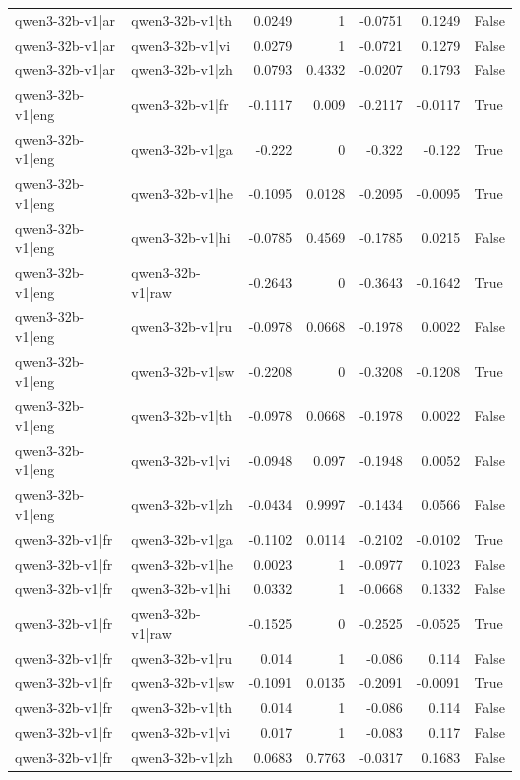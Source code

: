 \begin{table}
\begin{tabular}{l l r r r r l}
qwen3-32b-v1|ar & qwen3-32b-v1|th & 0.0249 & 1 & -0.0751 & 0.1249 & False \\
qwen3-32b-v1|ar & qwen3-32b-v1|vi & 0.0279 & 1 & -0.0721 & 0.1279 & False \\
qwen3-32b-v1|ar & qwen3-32b-v1|zh & 0.0793 & 0.4332 & -0.0207 & 0.1793 & False \\
qwen3-32b-v1|eng & qwen3-32b-v1|fr & -0.1117 & 0.009 & -0.2117 & -0.0117 & True \\
qwen3-32b-v1|eng & qwen3-32b-v1|ga & -0.222 & 0 & -0.322 & -0.122 & True \\
qwen3-32b-v1|eng & qwen3-32b-v1|he & -0.1095 & 0.0128 & -0.2095 & -0.0095 & True \\
qwen3-32b-v1|eng & qwen3-32b-v1|hi & -0.0785 & 0.4569 & -0.1785 & 0.0215 & False \\
qwen3-32b-v1|eng & qwen3-32b-v1|raw & -0.2643 & 0 & -0.3643 & -0.1642 & True \\
qwen3-32b-v1|eng & qwen3-32b-v1|ru & -0.0978 & 0.0668 & -0.1978 & 0.0022 & False \\
qwen3-32b-v1|eng & qwen3-32b-v1|sw & -0.2208 & 0 & -0.3208 & -0.1208 & True \\
qwen3-32b-v1|eng & qwen3-32b-v1|th & -0.0978 & 0.0668 & -0.1978 & 0.0022 & False \\
qwen3-32b-v1|eng & qwen3-32b-v1|vi & -0.0948 & 0.097 & -0.1948 & 0.0052 & False \\
qwen3-32b-v1|eng & qwen3-32b-v1|zh & -0.0434 & 0.9997 & -0.1434 & 0.0566 & False \\
qwen3-32b-v1|fr & qwen3-32b-v1|ga & -0.1102 & 0.0114 & -0.2102 & -0.0102 & True \\
qwen3-32b-v1|fr & qwen3-32b-v1|he & 0.0023 & 1 & -0.0977 & 0.1023 & False \\
qwen3-32b-v1|fr & qwen3-32b-v1|hi & 0.0332 & 1 & -0.0668 & 0.1332 & False \\
qwen3-32b-v1|fr & qwen3-32b-v1|raw & -0.1525 & 0 & -0.2525 & -0.0525 & True \\
qwen3-32b-v1|fr & qwen3-32b-v1|ru & 0.014 & 1 & -0.086 & 0.114 & False \\
qwen3-32b-v1|fr & qwen3-32b-v1|sw & -0.1091 & 0.0135 & -0.2091 & -0.0091 & True \\
qwen3-32b-v1|fr & qwen3-32b-v1|th & 0.014 & 1 & -0.086 & 0.114 & False \\
qwen3-32b-v1|fr & qwen3-32b-v1|vi & 0.017 & 1 & -0.083 & 0.117 & False \\
qwen3-32b-v1|fr & qwen3-32b-v1|zh & 0.0683 & 0.7763 & -0.0317 & 0.1683 & False \\

\end{tabular}
\end{table}
